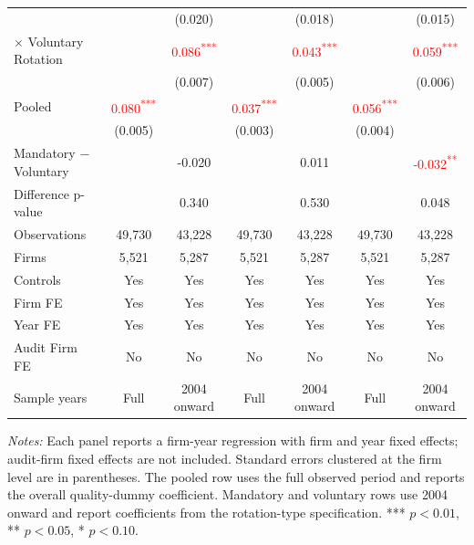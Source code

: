 \documentclass[10pt]{article}
\newcommand{\sym}[1]{\textsuperscript{#1}}
\begin{document}
\begin{minipage}{19cm}
\begin{threeparttable}
\begin{tabular}{l cc cc cc}
 &  & (0.020) &  & (0.018) &  & (0.015) \\
$\times$ Voluntary Rotation &  & \textcolor{red}{0.086\sym{***}} &  & \textcolor{red}{0.043\sym{***}} &  & \textcolor{red}{0.059\sym{***}} \\
 &  & (0.007) &  & (0.005) &  & (0.006) \\
Pooled & \textcolor{red}{0.080\sym{***}} &  & \textcolor{red}{0.037\sym{***}} &  & \textcolor{red}{0.056\sym{***}} &  \\
 & (0.005) &  & (0.003) &  & (0.004) &  \\
Mandatory $-$ Voluntary &  & -0.020 &  & 0.011 &  & \textcolor{red}{-0.032\sym{**}} \\
Difference p-value &  & 0.340 &  & 0.530 &  & 0.048 \\
Observations & 49,730 & 43,228 & 49,730 & 43,228 & 49,730 & 43,228 \\
Firms & 5,521 & 5,287 & 5,521 & 5,287 & 5,521 & 5,287 \\
\midrule
Controls & Yes & Yes & Yes & Yes & Yes & Yes \\
Firm FE & Yes & Yes & Yes & Yes & Yes & Yes \\
Year FE & Yes & Yes & Yes & Yes & Yes & Yes \\
Audit Firm FE & No & No & No & No & No & No \\
Sample years & Full & 2004 onward & Full & 2004 onward & Full & 2004 onward \\
\bottomrule
\end{tabular}
\begin{tablenotes}\fontsize{9}{11}\selectfont
\item \fontsize{9}{11}\selectfont \textit{Notes:} Each panel reports a firm-year regression with firm and year fixed effects; audit-firm fixed effects are not included. Standard errors clustered at the firm level are in parentheses. The pooled row uses the full observed period and reports the overall quality-dummy coefficient. Mandatory and voluntary rows use 2004 onward and report coefficients from the rotation-type specification. *** \(p<0.01\), ** \(p<0.05\), * \(p<0.10\).
\end{tablenotes}
\end{threeparttable}

\end{minipage}
\end{document}
